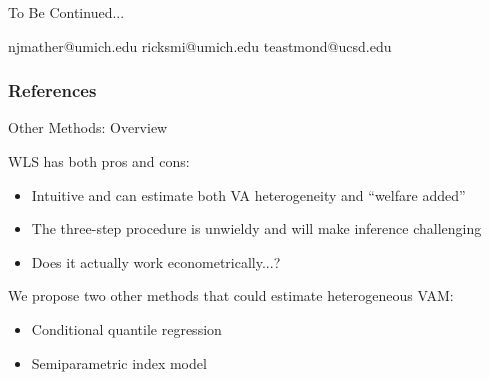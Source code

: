 \documentclass[t,aspectratio=169,11pt]{beamer}
\newenvironment{wideitemize}{\itemize\addtolength{\itemsep}{14pt}}{\enditemize}
\begin{document}


\begin{frame}[c]
\centering
\Huge{\centerline{To Be Continued...}}
\normalsize njmather{\selectfont @}umich.edu \hspace{2em}
ricksmi{\selectfont @}umich.edu \hspace{2em} \normalsize teastmond{\selectfont @}ucsd.edu
\end{frame}



\begin{frame}
\frametitle{References}
\tiny

\end{frame}



\appendix
{}




\begin{frame}[label=methods]{Other Methods: Overview}

\begin{wideitemize}

\item WLS has both pros and cons:
\begin{itemize}
    \item Intuitive and can estimate both VA heterogeneity and ``welfare added'' %
    \item The three-step procedure is unwieldy and will make inference challenging
    \item Does it actually work econometrically...? 
\end{itemize}

\item We propose two other methods that could estimate heterogeneous VAM:
\begin{itemize}
    \item Conditional quantile regression
    \item Semiparametric index model
\end{itemize}

\end{wideitemize}

\end{frame}
\end{document}
